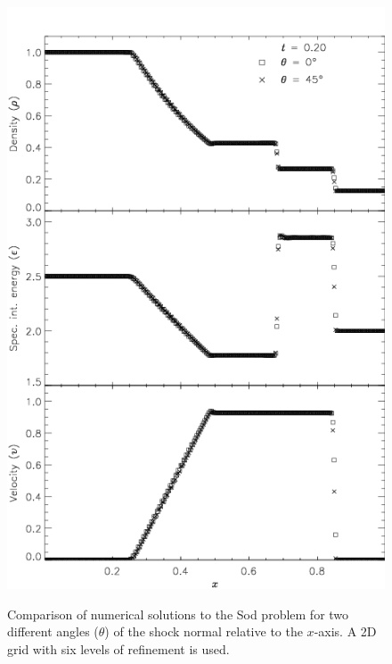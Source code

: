 \begin{figure}
\begin{center}
{\leavevmode\includegraphics[width=5in]{Sod_compare}}
\end{center}
\caption{\label{Fig:Sod comparison} Comparison of numerical
solutions to the Sod problem for two different angles ($\theta$) of the
shock normal relative to the $x$-axis. A 2D grid with six levels of
refinement is used.
}
\end{figure}

